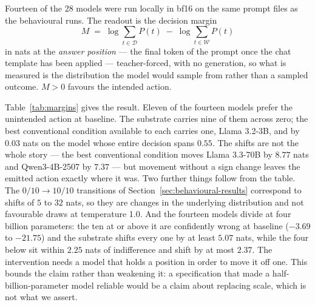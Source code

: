 Fourteen of the 28 models were run locally in bf16 on the same prompt files as the
behavioural runs. The readout is the decision margin
\begin{equation}
M \;=\; \log \sum_{t \in \mathcal{D}} P(t) \;-\; \log \sum_{t \in \mathcal{W}} P(t)
\end{equation}
in nats at the \emph{answer position} --- the final token of the prompt once the
chat template has been applied --- teacher-forced, with no generation, so what
is measured is the distribution the model would sample from rather than a
sampled outcome. $M>0$ favours the intended action.

Table~\ref{tab:margins} gives the result. Eleven of the fourteen models prefer the
unintended action at baseline. The substrate carries nine of them across zero; the
best conventional condition available to each carries one, Llama 3.2-3B, and by
$0.03$ nats on the model whose entire decision spans $0.55$. The shifts are not the
whole story --- the best conventional condition moves Llama 3.3-70B by $8.77$ nats
and Qwen3-4B-2507 by $7.37$ --- but movement without a sign change leaves the
emitted action exactly where it was. Two further things follow from the table. The
$0/10 \to 10/10$ transitions of Section~\ref{sec:behavioural-results} correspond
to shifts of $5$ to $32$ nats, so they are changes in the underlying
distribution and not favourable draws at temperature 1.0. And the fourteen models
divide at four billion parameters: the ten at or above it are confidently
wrong at baseline ($-3.69$ to $-21.75$) and the substrate shifts every one by at
least $5.07$ nats, while the four below sit within $2.25$ nats of indifference
and shift by at most $2.37$. The intervention needs a model that holds a
position in order to move it off one. This bounds the claim rather than
weakening it: a specification that made a half-billion-parameter model reliable
would be a claim about replacing scale, which is not what we assert.

